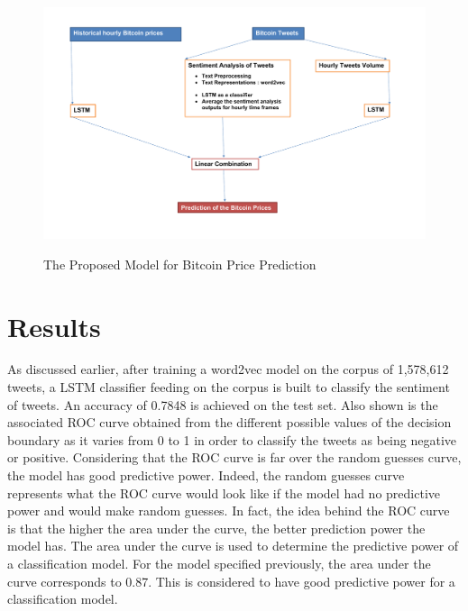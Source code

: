 \documentclass[conference]{IEEEtran}
\begin{document}
\begin{minipage}{\linewidth}
\begin{figure}[H]
\centering
\caption{The Proposed Model for Bitcoin Price Prediction} 
\includegraphics[scale=0.28]{Graphs/PlanProject.pdf}
\label{Project Plan} 
\end{figure}
\end{minipage}

\section{Results}
\par As discussed earlier, after training a word2vec model on the corpus of 1,578,612 tweets, a LSTM classifier feeding on the corpus is built to classify the sentiment of tweets. An accuracy of 0.7848 is achieved on the test set. Also shown is the associated ROC curve obtained from the different possible values of the decision boundary as it varies from 0 to 1 in order to classify the tweets as being negative or positive. Considering that the ROC curve is far over the random guesses curve, the model has good predictive power. Indeed, the random guesses curve represents what the ROC curve would look like if the model had no predictive power and would make random guesses. In fact, the idea behind the ROC curve is that the higher the area under the curve, the better prediction power the model has. The area under the curve is used to determine the predictive power of a classification model. For the model specified previously, the area under the curve corresponds to 0.87. This is considered to have good predictive power for a classification model.
\end{document}
